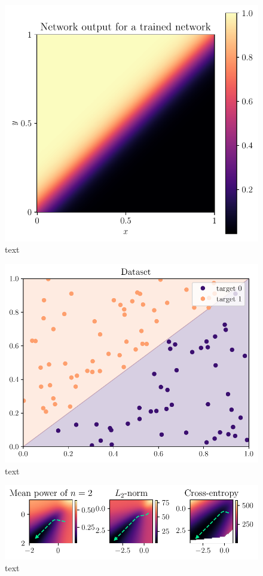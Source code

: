\begin{figure}
	\centering
	\includegraphics{Experiment2/plots/Network_output.pdf}
	\caption{text}
\end{figure}

\begin{figure}
	\centering
	\includegraphics{Experiment2/plots/Dataset.pdf}
	\caption{text}
\end{figure}

\begin{figure}
	\centering
	\includegraphics{Experiment2/plots/LossSurfaces.pdf}
	\caption{text}
\end{figure}